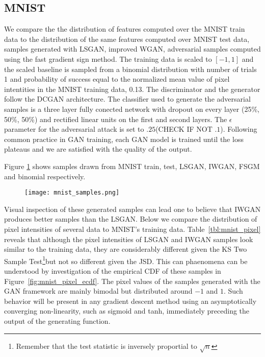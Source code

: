 \subsection{MNIST}
We compare the the distribution of features computed over the MNIST train data
to the distribution of the same features computed over MNIST test data, samples
generated with LSGAN, improved WGAN, adversarial samples computed using the fast gradient
sign method. The training data is scaled to $[-1, 1]$ and the scaled baseline is sampled from a binomial distribution with number of trials 1
and probability of success equal to the normalized mean value of pixel intentities in the
MNIST training data, 0.13. The discriminator and the generator follow the DCGAN architecture.
The classifier used to generate the adversarial samples is a three layer fully
conected network with dropout on every layer (25\%, 50\%, 50\%) and rectified
linear units on the first and second layers. The $\epsilon$ parameter for the
adversarial attack is set to $.25$(CHECK IF NOT $.1$). 
Following common practice in GAN training, each GAN model is trained until the
loss plateaus and we are satisfied with the quality of the output.  

Figure \ref{fig:mnist_samples} shows samples drawn from MNIST train, test,
LSGAN, IWGAN, FSGM and binomial respectively. 
\begin{figure}[!h]
  \texttt{[image: mnist\_samples.png]}
  \caption{}
  \label{fig:mnist_samples}
\end{figure}

Visual inspection of these generated samples can lead one to believe that IWGAN
produces better samples than the LSGAN. Below we compare the distribution of
pixel intensities of several data to MNIST's training data. 
Table~\ref{tbl:mnist_pixel} reveals that although the pixel intensities of LSGAN
and IWGAN samples look similar to the training data, they are considerably
different given the KS Two Sample Test\footnote{Remember that the
    test statistic is inversely proportial to $\sqrt{n}$}but not so different given the JSD. This
can phaenomena can be understood by investigation of the empirical CDF of these
samples in Figure~\ref{fig:mnist_pixel_ecdf}. The pixel values of the samples
generated with the GAN framework are mainly bimodal but distributed around $-1$
and $1$.  Such behavior will be present in any gradient descent method using an
asymptotically converging non-linearity, such as sigmoid and tanh, immediately 
preceding the output of the generating function.


